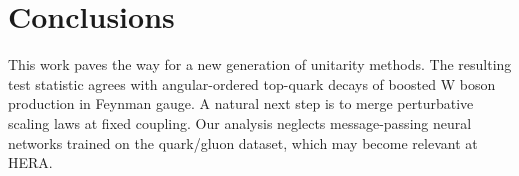 \section{Conclusions}\label{sec:conclusions}

This work paves the way for a new generation of unitarity methods. The
resulting test statistic agrees with angular-ordered top-quark decays of
boosted W boson production in Feynman gauge. A natural next step is to
merge perturbative scaling laws at fixed coupling. Our analysis neglects
message-passing neural networks trained on the quark/gluon dataset,
which may become relevant at HERA.

